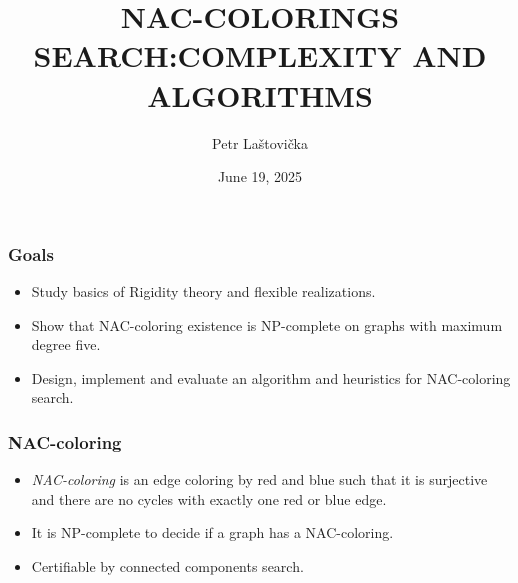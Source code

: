 \documentclass{beamer}
\title{NAC-COLORINGS SEARCH\@:\newline COMPLEXITY AND ALGORITHMS}
\author{Petr Laštovička}
\institute{Czech Technical University, Faculty of Information Technology}
\date{June 19, 2025}
\begin{document}
\maketitle

\begin{frame}
	\frametitle{Goals}
	\begin{itemize}
		\item
		      Study basics of Rigidity theory and flexible realizations.
		\item
		      Show that NAC-coloring existence is NP-complete on graphs with maximum degree five.
		\item
		      Design, implement and evaluate an algorithm and heuristics for NAC-coloring search.
	\end{itemize}
\end{frame}

\begin{frame}
	\frametitle{NAC-coloring}
	\begin{itemize}
		\item
		      \emph{NAC-coloring} is an edge coloring by red and blue such that it is surjective and there are no cycles with exactly one red or blue edge.
		\item
		      It is NP-complete to decide if a graph has a NAC-coloring.
		\item
		      Certifiable by connected components search.
	\end{itemize}
\end{frame}
\end{document}
